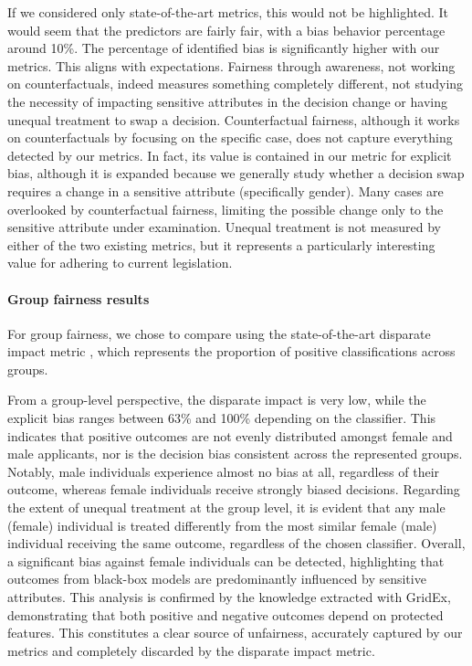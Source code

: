 \documentclass[letterpaper]{article} %
\begin{document}
If we considered only state-of-the-art metrics, this would not be highlighted. It would seem that the predictors are fairly fair, with a bias behavior percentage around 10\%. The percentage of identified bias is significantly higher with our metrics. This aligns with expectations. Fairness through awareness, not working on counterfactuals, indeed measures something completely different, not studying the necessity of impacting sensitive attributes in the decision change or having unequal treatment to swap a decision.
%
Counterfactual fairness, although it works on counterfactuals by focusing on the specific case, does not capture everything detected by our metrics. In fact, its value is contained in our metric for explicit bias, although it is expanded because we generally study whether a decision swap requires a change in a sensitive attribute (specifically gender). Many cases are overlooked by counterfactual fairness, limiting the possible change only to the sensitive attribute under examination.
%
Unequal treatment is not measured by either of the two existing metrics, but it represents a particularly interesting value for adhering to current legislation.

\paragraph{Group fairness results}
For group fairness, we chose to compare using the state-of-the-art disparate impact metric \cite{FeldmanFMSV15}, which represents the proportion of positive classifications across groups.

From a group-level perspective, the disparate impact is very low, while the explicit bias ranges between 63\% and 100\% depending on the classifier. This indicates that positive outcomes are not evenly distributed amongst female and male applicants, nor is the decision bias consistent across the represented groups.
%
Notably, male individuals experience almost no bias at all, regardless of their outcome, whereas female individuals receive strongly biased decisions. Regarding the extent of unequal treatment at the group level, it is evident that any male (female) individual is treated differently from the most similar female (male) individual receiving the same outcome, regardless of the chosen classifier.
%
Overall, a significant bias against female individuals can be detected, highlighting that outcomes from black-box models are predominantly influenced by sensitive attributes. This analysis is confirmed by the knowledge extracted with GridEx, demonstrating that both positive and negative outcomes depend on protected features. This constitutes a clear source of unfairness, accurately captured by our metrics and completely discarded by the disparate impact metric.
\end{document}
